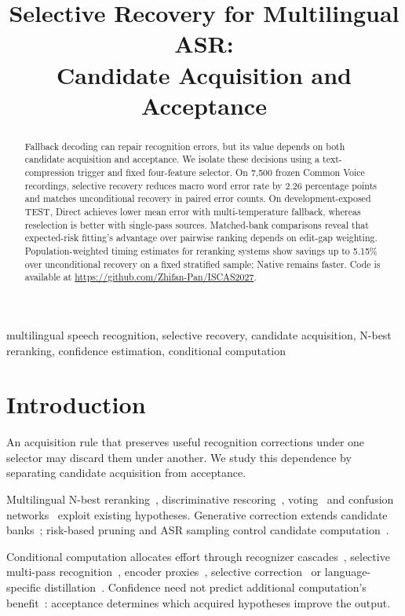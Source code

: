 \documentclass[conference,letterpaper]{IEEEtran}
\title{Selective Recovery for Multilingual ASR:\\Candidate Acquisition and Acceptance}
\begin{document}
\maketitle\flushbottom
\setlength{\parskip}{0pt plus 4pt}
\begin{abstract}
Fallback decoding can repair recognition errors, but its value depends on both candidate acquisition and acceptance. We isolate these decisions using a text-compression trigger and fixed four-feature selector. On 7,500 frozen Common Voice recordings, selective recovery reduces macro word error rate by 2.26 percentage points and matches unconditional recovery in paired error counts. On development-exposed TEST, Direct achieves lower mean error with multi-temperature fallback, whereas reselection is better with single-pass sources. Matched-bank comparisons reveal that expected-risk fitting's advantage over pairwise ranking depends on edit-gap weighting. Population-weighted timing estimates for reranking systems show savings up to 5.15\% over unconditional recovery on a fixed stratified sample; Native remains faster. Code is available at \url{https://github.com/Zhifan-Pan/ISCAS2027}.
\end{abstract}
\begin{IEEEkeywords}
multilingual speech recognition, selective recovery, candidate acquisition, N-best reranking, confidence estimation, conditional computation
\end{IEEEkeywords}

\section{Introduction}
An acquisition rule that preserves useful recognition corrections under one selector may discard them under another. We study this dependence by separating candidate acquisition from acceptance.

Multilingual N-best reranking~\cite{gaur2022,yan2025wild}, discriminative rescoring~\cite{rescorebert,discriminative2023,audioattention2019}, voting~\cite{fiscus1997} and confusion networks~\cite{mangu2000} exploit existing hypotheses. Generative correction extends candidate banks~\cite{kuo2026framework,dutta2022,progres2024,whisperingllama}; risk-based pruning and ASR sampling control candidate computation~\cite{cheng2023pruning,jinnai2025mbrasr}.

Conditional computation allocates effort through recognizer cascades~\cite{xue2025sima}, selective multi-pass recognition~\cite{aleksic2025}, encoder proxies~\cite{fathullah2024proxies}, selective correction~\cite{lim2025hybrid} or language-specific distillation~\cite{ferraz2024distil}. Confidence need not predict additional computation's benefit~\cite{jitkrittum2023cascade}: acceptance determines which acquired hypotheses improve the output.
\end{document}
